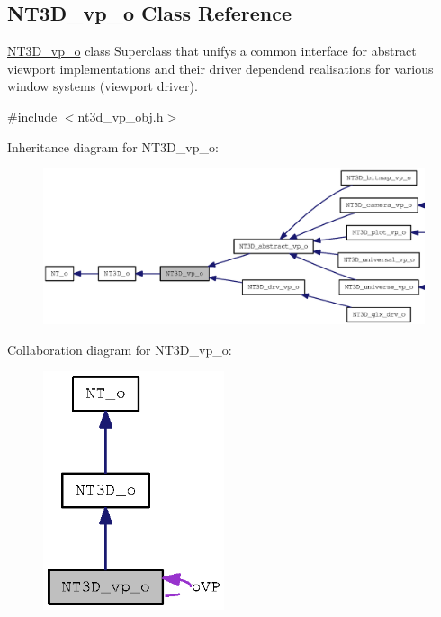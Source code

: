 \subsection{NT3D\_\-vp\_\-o Class Reference}
\label{class_n_t3_d__vp__o}


\hyperlink{class_n_t3_d__vp__o}{NT3D\_\-vp\_\-o} class Superclass that unifys a common interface for abstract viewport implementations and their driver dependend realisations for various window systems (viewport driver).  




{\ttfamily \#include $<$nt3d\_\-vp\_\-obj.h$>$}



Inheritance diagram for NT3D\_\-vp\_\-o:
\nopagebreak
\begin{figure}[H]
\begin{center}
\leavevmode
\includegraphics[width=400pt]{class_n_t3_d__vp__o__inherit__graph}
\end{center}
\end{figure}


Collaboration diagram for NT3D\_\-vp\_\-o:
\nopagebreak
\begin{figure}[H]
\begin{center}
\leavevmode
\includegraphics[width=151pt]{class_n_t3_d__vp__o__coll__graph}
\end{center}
\end{figure}
